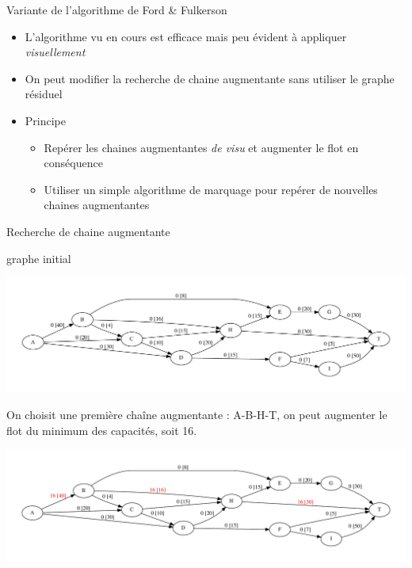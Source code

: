 \begin{frame}{Variante de l'algorithme de Ford \& Fulkerson}
    \begin{itemize}
        \item L'algorithme vu en cours est efficace mais peu évident à appliquer \emph{visuellement}
        \item On peut modifier la recherche de chaine augmentante sans utiliser le graphe résiduel
        \item Principe 
        \begin{itemize}
            \item Repérer les chaines augmentantes \emph{de visu} et augmenter le flot en conséquence 
            \item Utiliser un simple algorithme de marquage pour repérer de nouvelles chaines augmentantes
        \end{itemize}
    \end{itemize}
\end{frame}

\begin{frame}{Recherche de chaine augmentante}

\end{frame}

\begin{frame}{graphe initial}
        \begin{center}
            \includegraphics[width=\textwidth]{tutorials/pcc/figs/reseau.pdf}
        \end{center}
        
        
\end{frame}

\begin{frame}{}
    On choisit une première chaîne augmentante : A-B-H-T, on peut augmenter le flot du minimum des capacités, soit 16.
    \begin{center}
        \includegraphics[width=\textwidth]{tutorials/pcc/figs/reseau-1.pdf}
    \end{center}
\end{frame}

